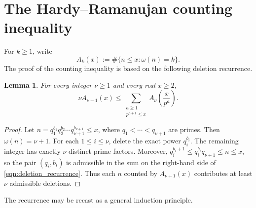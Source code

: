 \documentclass[12pt,a4paper,reqno]{amsart}
\theoremstyle{plain}
\newtheorem{lmm}[thrm]{Lemma}
\numberwithin{sblmm}{thrm}
\numberwithin{equation}{section}
\begin{document}
\section{The Hardy--Ramanujan counting inequality}
For $k\ge 1$, write
$$A_k(x):=\#\{n\le x:\omega(n)=k\}.$$
The proof of the counting inequality is based on the following deletion recurrence.

\begin{lmm}\label{lem:deletion_recurrence}
    For every integer $\nu\ge 1$ and every real $x\ge 2$,
    \begin{equation}\label{eqn:deletion_recurrence}
    \nu A_{\nu+1}(x)\le\sum_{\substack{a\ge 1\\ p^{a+1}\le x}}A_{\nu}\left(\frac{x}{p^a}\right).
    \end{equation}
\end{lmm}
\begin{proof}
    Let $n=q_1^{b_1}q_2^{b_2}\cdots q_{\nu+1}^{b_{\nu+1}}\le x$, where $q_1<\cdots<q_{\nu+1}$ are primes. Then $\omega(n)=\nu+1$. For each $1\le i\le\nu$, delete the exact power $q_i^{b_i}$. The remaining integer has exactly $\nu$ distinct prime factors. Moreover, $q_i^{b_i+1}\le q_i^{b_i}q_{\nu+1}\le n\le x$, so the pair $(q_i,b_i)$ is admissible in the sum on the right-hand side of \eqref{eqn:deletion_recurrence}. Thus each $n$ counted by $A_{\nu+1}(x)$ contributes at least $\nu$ admissible deletions.
\end{proof}

The recurrence may be recast as a general induction principle.
\end{document}
